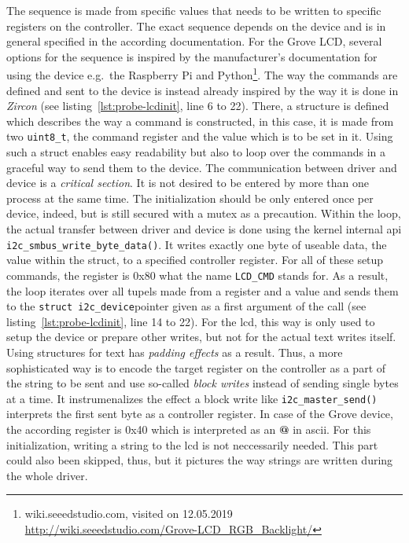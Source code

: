 The sequence is made from specific values that needs to be written to specific registers on the controller.
The exact sequence depends on the device and is in general specified in the according documentation.
For the Grove LCD, several options for the sequence is inspired by the manufacturer's documentation for using the device e.g.\ the Raspberry Pi and Python\footnote{wiki.seeedstudio.com, visited on 12.05.2019 \url{http://wiki.seeedstudio.com/Grove-LCD_RGB_Backlight/}}.
The way the commands are defined and sent to the device is instead already inspired by the way it is done in \textit{Zircon} (see listing~\ref{lst:probe-lcdinit}, line 6 to 22).
There, a structure is defined which describes the way a command is constructed, in this case, it is made from two \texttt{uint8_t}, the command register and the value which is to be set in it.
Using such a struct enables easy readability but also to loop over the commands in a graceful way to send them to the device.
The communication between driver and device is a \textit{critical section}.
It is not desired to be entered by more than one process at the same time.
The initialization should be only entered once per device, indeed, but is still secured with a mutex as a precaution.
Within the loop, the actual transfer between driver and device is done using the kernel internal \ac{api} \texttt{i2c_smbus_write_byte_data()}.
It writes exactly one byte of useable data, the value within the struct, to a specified controller register.
For all of these setup commands, the register is 0x80 what the name \texttt{LCD_CMD} stands for.
As a result, the loop iterates over all tupels made from a register and a value and sends them to the \texttt{struct i2c_device}pointer given as a first argument of the call (see listing~\ref{lst:probe-lcdinit}, line 14 to 22).
For the \ac{lcd}, this way is only used to setup the device or prepare other writes, but not for the actual text writes itself.
Using structures for text has \textit{padding effects} as a result.
Thus, a more sophisticated way is to encode the target register on the controller as a part of the string to be sent and use so-called \textit{block writes} instead of sending single bytes at a time.
It instrumenalizes the effect a block write like \texttt{i2c_master_send()} interprets the first sent byte as a controller register.
In case of the Grove device, the according register is 0x40 which is interpreted as an \textbf{@} in \ac{ascii}.
For this initialization, writing a string to the \ac{lcd} is not neccessarily needed.
This part could also been skipped, thus, but it pictures the way strings are written during the whole driver.
